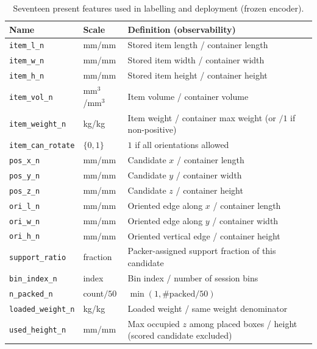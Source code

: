 \begin{table}[t]
\centering
\caption{Seventeen present features used in labelling and deployment (frozen encoder).}
\label{tab:features17}
\begin{tabularx}{\linewidth}{@{}ll>{\raggedright\arraybackslash}X@{}}
\toprule
Name & Scale & Definition (observability) \\
\midrule
\texttt{item\_l\_n} & mm/mm & Stored item length / container length \\
\texttt{item\_w\_n} & mm/mm & Stored item width / container width \\
\texttt{item\_h\_n} & mm/mm & Stored item height / container height \\
\texttt{item\_vol\_n} & mm$^3$/mm$^3$ & Item volume / container volume \\
\texttt{item\_weight\_n} & kg/kg & Item weight / container max weight (or $/1$ if non-positive) \\
\texttt{item\_can\_rotate} & $\{0,1\}$ & $1$ if all orientations allowed \\
\texttt{pos\_x\_n} & mm/mm & Candidate $x$ / container length \\
\texttt{pos\_y\_n} & mm/mm & Candidate $y$ / container width \\
\texttt{pos\_z\_n} & mm/mm & Candidate $z$ / container height \\
\texttt{ori\_l\_n} & mm/mm & Oriented edge along $x$ / container length \\
\texttt{ori\_w\_n} & mm/mm & Oriented edge along $y$ / container width \\
\texttt{ori\_h\_n} & mm/mm & Oriented vertical edge / container height \\
\texttt{support\_ratio} & fraction & Packer-assigned support fraction of this candidate \\
\texttt{bin\_index\_n} & index & Bin index / number of session bins \\
\texttt{n\_packed\_n} & count$/50$ & $\min(1,\#\mathrm{packed}/50)$ \\
\texttt{loaded\_weight\_n} & kg/kg & Loaded weight / same weight denominator \\
\texttt{used\_height\_n} & mm/mm & Max occupied $z$ among placed boxes / height (scored candidate excluded) \\
\bottomrule
\end{tabularx}
\end{table}

